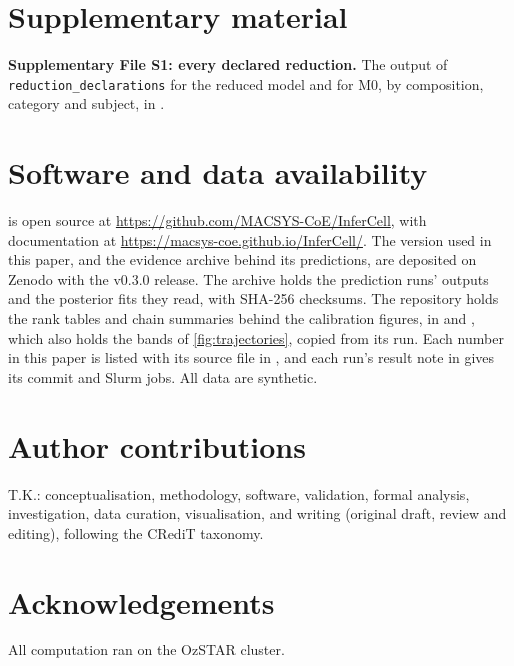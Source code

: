\section*{Supplementary material}

\textbf{Supplementary File S1: every declared reduction.} The output of \texttt{reduction\_declarations} for the
reduced model and for M0, by composition, category and subject, in
.

\section*{Software and data availability}
\label{sec:availability}

\IC{} is open source at \url{https://github.com/MACSYS-CoE/InferCell}, with
documentation at \url{https://macsys-coe.github.io/InferCell/}. The version used in this paper, and the evidence archive behind
its predictions, are deposited on Zenodo with the v0.3.0 release. The archive holds the prediction runs' outputs and the posterior fits they read, with SHA-256 checksums. The repository holds the rank tables and chain summaries behind the calibration figures, in  and , which also holds the bands of \cref{fig:trajectories}, copied from its run. Each number in this paper is listed with its source file in
, and each run's result note in  gives its
commit and Slurm jobs. All data are synthetic.

\section*{Author contributions}
T.K.: conceptualisation, methodology, software, validation, formal analysis, investigation, data
curation, visualisation, and writing (original draft, review and editing), following the CRediT
taxonomy.

\section*{Acknowledgements}
All computation ran on the OzSTAR cluster.
